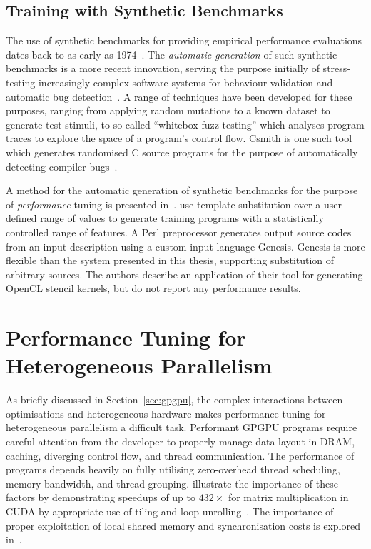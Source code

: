 \subsection{Training with Synthetic Benchmarks}

The use of synthetic benchmarks for providing empirical performance
evaluations dates back to as early as 1974~\cite{Curnow1976}. The
\emph{automatic generation} of such synthetic benchmarks is a more
recent innovation, serving the purpose initially of stress-testing
increasingly complex software systems for behaviour validation and
automatic bug detection~\cite{Verplaetse2000,Godefroid2008}. A range
of techniques have been developed for these purposes, ranging from
applying random mutations to a known dataset to generate test stimuli,
to so-called ``whitebox fuzz testing'' which analyses program traces
to explore the space of a program's control flow. Csmith is one such
tool which generates randomised C source programs for the purpose of
automatically detecting compiler bugs~\cite{Yang2012}.

A method for the automatic generation of synthetic benchmarks for the
purpose of \emph{performance} tuning is presented
in~\cite{Chiu2015}. \citeauthor{Chiu2015} use template substitution
over a user-defined range of values to generate training programs with
a statistically controlled range of features. A Perl preprocessor
generates output source codes from an input description using a custom
input language Genesis. Genesis is more flexible than the system
presented in this thesis, supporting substitution of arbitrary
sources. The authors describe an application of their tool for
generating OpenCL stencil kernels, but do not report any performance
results.


\section{Performance Tuning for Heterogeneous Parallelism}

As briefly discussed in Section~\ref{sec:gpgpu}, the complex
interactions between optimisations and heterogeneous hardware makes
performance tuning for heterogeneous parallelism a difficult
task. Performant GPGPU programs require careful attention from the
developer to properly manage data layout in DRAM, caching, diverging
control flow, and thread communication. The performance of programs
depends heavily on fully utilising zero-overhead thread scheduling,
memory bandwidth, and thread grouping. \citeauthor{Ryoo2008a}
illustrate the importance of these factors by demonstrating speedups
of up to $432\times$ for matrix multiplication in CUDA by appropriate
use of tiling and loop unrolling~\cite{Ryoo2008a}. The importance of
proper exploitation of local shared memory and synchronisation costs
is explored in~\cite{Lee2010}.

